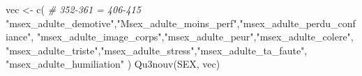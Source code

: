 \documentclass[
]{article}
\newenvironment{Shaded}{\begin{snugshade}}{\end{snugshade}}
\newcommand{\CommentTok}[1]{\textcolor[rgb]{0.56,0.35,0.01}{\textit{#1}}}
\newcommand{\FunctionTok}[1]{\textcolor[rgb]{0.00,0.00,0.00}{#1}}
\newcommand{\NormalTok}[1]{#1}
\newcommand{\OtherTok}[1]{\textcolor[rgb]{0.56,0.35,0.01}{#1}}
\newcommand{\StringTok}[1]{\textcolor[rgb]{0.31,0.60,0.02}{#1}}
\begin{document}
\begin{Shaded}
\begin{Highlighting}[]
\NormalTok{vec }\OtherTok{\textless{}{-}} \FunctionTok{c}\NormalTok{(  }\CommentTok{\# 352{-}361 = 406{-}415}
  \StringTok{"msex\_adulte\_demotive"}\NormalTok{,}\StringTok{"Msex\_adulte\_moins\_perf"}\NormalTok{,}\StringTok{"msex\_adulte\_perdu\_confiance"}\NormalTok{,}
  \StringTok{"msex\_adulte\_image\_corps"}\NormalTok{,}\StringTok{"msex\_adulte\_peur"}\NormalTok{,}\StringTok{"msex\_adulte\_colere"}\NormalTok{,}
  \StringTok{"msex\_adulte\_triste"}\NormalTok{,}\StringTok{"msex\_adulte\_stress"}\NormalTok{,}\StringTok{"msex\_adulte\_ta\_faute"}\NormalTok{,}
  \StringTok{"msex\_adulte\_humiliation"}
\NormalTok{  )}
\FunctionTok{Qu3nouv}\NormalTok{(SEX, vec)}
\end{Highlighting}
\end{Shaded}
\end{document}
